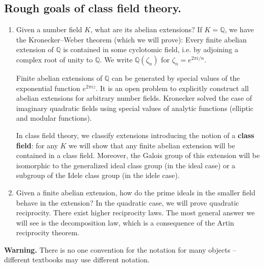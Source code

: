 \documentclass{article}
\theoremstyle{definition}
\begin{document}
\subsection{Rough goals of class field theory.}
\begin{enumerate}[(1)]
    \item Given a number field $K$, what are its abelian extensions? If $K = \mathbb{Q}$, we have the Kronecker--Weber theorem (which we will prove): Every finite abelian extension of $\mathbb{Q}$ is contained in some cyclotomic field, i.e. by adjoining a complex root of unity to $\mathbb{Q}$. We write $\mathbb{Q}(\zeta_n)$ for $\zeta_n = e^{2\pi i/n}$. 
    \vspace{1mm}
     
    Finite abelian extensions of $\mathbb{Q}$ can be generated by special values of the exponential function $e^{2\pi i z}$. It is an open problem to explicitly construct all abelian extensions for arbitrary number fields. Kronecker solved the case of imaginary quadratic fields using special values of analytic functions (elliptic and modular functions).
    \vspace{1mm}
     
    In class field theory, we classify extensions introducing the notion of a \textbf{class field}: for any $K$ we will show that any finite abelian extension will be contained in a class field. Moreover, the Galois group of this extension will be isomorphic to the generalized ideal class group (in the ideal case) or a subgroup of the Idele class group (in the idele case).
    \item Given a finite abelian extension, how do the prime ideals in the smaller field behave in the extension? In the quadratic case, we will prove quadratic reciprocity. There exist higher reciprocity laws. The most general answer we will see is the decomposition law, which is a consequence of the Artin reciprocity theorem.
\end{enumerate} 
\textbf{Warning.} There is no one convention for the notation for many objects -- different textbooks may use different notation.
\vspace{1mm}
 
\end{document}
